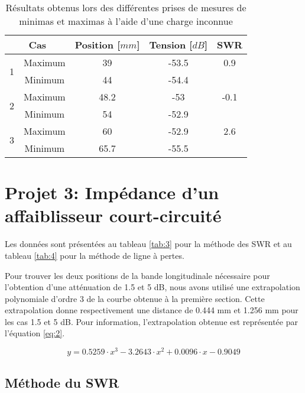 \begin{table}[htbp]
    \centering
    \begin{tabular}{|c|c||c|c|c|} \hline
       \multicolumn{2}{|c||}{Cas}  & Position [$mm$] & Tension [$dB$] & SWR\\ \hline \hline
\multirow{2}{*}{1} & Maximum & 39 & -53.5 & 0.9\\ 
 & Minimum & 44 & -54.4 & \\ \hline
\multirow{2}{*}{2} & Maximum & 48.2 & -53 & -0.1\\ 
 & Minimum & 54 & -52.9 & \\ \hline
\multirow{2}{*}{3} & Maximum & 60 & -52.9 & 2.6\\ 
 & Minimum & 65.7 & -55.5 & \\ \hline
    \end{tabular}%
        \caption{Résultats obtenus lors des différentes prises de mesures de minimas et maximas à l'aide d'une charge inconnue}
    \label{tab:tabnum2.2}%
\end{table}%

\section{Projet 3: Impédance d'un affaiblisseur court-circuité}
Les données sont présentées au tableau \ref{tab:3} pour la méthode des SWR et au tableau \ref{tab:4} pour la méthode de ligne à pertes.

Pour trouver les deux positions de la bande longitudinale nécessaire pour l'obtention d'une atténuation de 1.5 et 5 dB, nous avons utilisé une extrapolation polynomiale d'ordre 3 de la courbe obtenue à la première section. Cette extrapolation donne respectivement une distance de 0.444 mm et 1.256 mm pour les cas 1.5 et 5 dB. Pour information, l'extrapolation obtenue est représentée par l'équation \ref{eq:2}.

\begin{equation}
\label{eq:2}
    y = 0.5259\cdot x^3 - 3.2643\cdot x^2 + 0.0096\cdot x - 0.9049
\end{equation}
\subsection{Méthode du SWR}

